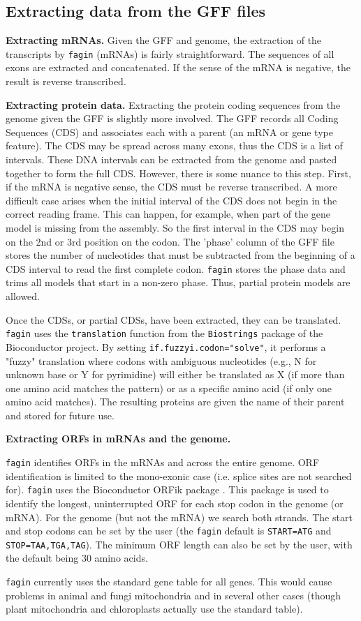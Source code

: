 \subsection{Extracting data from the
GFF files}\label{sec:derived-data}

{\bf Extracting mRNAs.} Given the GFF and genome, the extraction of the
transcripts by {\tt fagin} (mRNAs) is fairly straightforward.  The sequences of
all exons are extracted and concatenated. If the sense of the mRNA is negative,
the result is reverse transcribed.

\noindent
{\bf Extracting protein data.} Extracting the protein coding sequences from the
genome given the GFF is slightly more involved.  The GFF records all Coding
Sequences (CDS) and associates each with a parent (an mRNA or gene type
feature). The CDS may be spread across many exons, thus the CDS is a list of
intervals. These DNA intervals can be extracted from the genome and pasted
together to form the full CDS. However, there is some nuance to this step.
First, if the mRNA is negative sense, the CDS must be reverse transcribed. A
more difficult case arises when the initial interval of the CDS does not begin
in the correct reading frame.  This can happen, for example, when part of the
gene model is missing from the assembly. So the first interval in the CDS may
begin on the 2nd or 3rd position on the codon. The 'phase' column of the GFF
file stores the number of nucleotides that must be subtracted from the
beginning of a CDS interval to read the first complete codon. {\tt fagin}
stores the phase data and trims all models that start in a non-zero phase.
Thus, partial protein models are allowed.

Once the CDSs, or partial CDSs, have been extracted, they can be translated.
{\tt fagin} uses the {\tt translation} function from the {\tt Biostrings}
package of the Bioconductor project. By setting {\tt if.fuzzyi.codon="solve"},
it performs a "fuzzy" translation where codons with ambiguous nucleotides
(e.g., N for unknown base or Y for pyrimidine) will either be translated as X
(if more than one amino acid matches the pattern) or as a specific amino acid
(if only one amino acid matches). The resulting proteins are given the name of
their parent and stored for future use.

\noindent
{\bf Extracting ORFs in mRNAs and the genome.}

{\tt fagin} identifies ORFs in the mRNAs and across the entire genome. ORF
identification is limited to the mono-exonic case (i.e. splice sites are not
searched for). {\tt fagin}  uses the Bioconductor ORFik package \cite{orfik}.
This package is used to identify the longest, uninterrupted ORF for each stop
codon in the genome (or mRNA). For the genome (but not the mRNA) we search both
strands. The start and stop codons can be set by the user (the {\tt fagin}
default is {\tt START=ATG} and {\tt STOP={TAA,TGA,TAG}}). The minimum ORF
length can also be set by the user, with the default being 30 amino acids.

{\tt fagin} currently uses the standard gene table for all genes. This would cause
problems in animal and fungi mitochondria and in several other cases (though
plant mitochondria and chloroplasts actually use the standard table).
